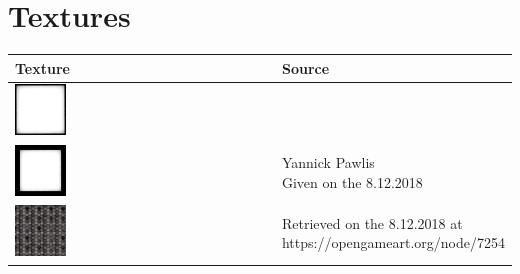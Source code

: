 \section{Textures}
\begin{centering}
\begin{tabular}{l|l}
Texture & Source \\
\hline
\includegraphics[width=0.2\textwidth]{Images/BlackBorder.png} &  \\
\includegraphics[width=0.2\textwidth]{Images/BlackThickBorder.png} & 
\makecell[l]{Yannick Pawlis \\ Given on the 8.12.2018} \\
\hline
\includegraphics[width=0.2\textwidth]{Images/airbase_radar_panels.jpg} & 
\makecell[l]{Retrieved on the 8.12.2018 at \\ \linebreak https://opengameart.org/node/7254}
\end{tabular}
\end{centering}